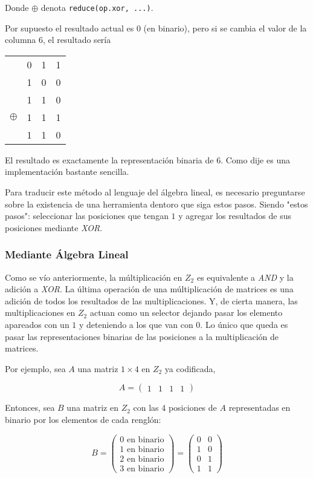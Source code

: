 \documentclass{article}
\begin{document}
Donde $\oplus$ denota \texttt{reduce(op.xor, ...)}.

Por supuesto el resultado actual es $0$ (en binario), pero si se cambia el valor de la columna 6, el resultado sería

\begin{center}
\begin{tabular}{c c c c}
    & 0 & 1 & 1 \\
    & 1 & 0 & 0 \\
    & 1 & 1 & 0 \\
    $\oplus$ & 1 & 1 & 1 \\
    \hline
    & 1 & 1 & 0
\end{tabular}
\end{center}

El resultado es exactamente la representación binaria de 6. Como dije es una implementación bastante sencilla.

Para traducir este método al lenguaje del álgebra lineal, es necesario preguntarse sobre la existencia de una herramienta dentoro que siga estos pasos. Siendo "estos pasos": seleccionar las posiciones que tengan $1$ y agregar los resultados de sus posiciones mediante \textit{XOR}.

\subsubsection{Mediante Álgebra Lineal}

Como se vío anteriormente, la múltiplicación en $Z_2$ es equivalente a \textit{AND} y la adición a \textit{XOR}. La última operación de una múltiplicación de matrices es una adición de todos los resultados de las multiplicaciones. Y, de cierta manera, las multiplicaciones en $Z_2$ actuan como un selector dejando pasar los elemento apareados con un $1$ y deteniendo a los que van con $0$. Lo único que queda es pasar las representaciones binarias de las posiciones a la multiplicación de matrices.

Por ejemplo, sea $A$ una matriz $1 \times 4$ en $Z_2$ ya codificada,

$$
A = \begin{pmatrix}
    1 & 1 & 1 & 1
\end{pmatrix}
$$

Entonces, sea $B$ una matriz en $Z_2$ con las 4 posiciones de $A$ representadas en binario por los elementos de cada renglón:

$$
B = \begin{pmatrix}
    \text{0 en binario} \\
    \text{1 en binario} \\
    \text{2 en binario} \\
    \text{3 en binario}
\end{pmatrix}
= \begin{pmatrix}
    0 & 0 \\
    1 & 0 \\
    0 & 1 \\
    1 & 1
\end{pmatrix}
$$
\end{document}
